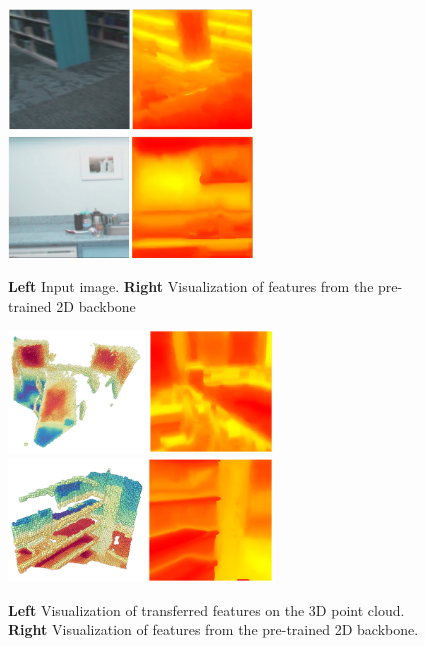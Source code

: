 \documentclass[10pt,twocolumn,letterpaper]{article}
\begin{document}
\begin{figure}
    \centering
    \includegraphics[width=6.5cm]{images/experiments/25.02.2022-image-pretrain-vis2.png}
    \includegraphics[width=6.5cm]{images/experiments/25.02.2022-image-pretrain-vis1.png}
    \caption{\textbf{Left} Input image. \textbf{Right} Visualization of features from the pre-trained 2D backbone}
    \label{fig:features2dvis}
\end{figure}

\begin{figure}
    \centering
    \includegraphics[width=7cm]{images/experiments/image-to-point-vis1.png}
    \includegraphics[width=7cm]{images/experiments/image-to-point-vis2.png}
    \caption{\textbf{Left} Visualization of transferred features on the 3D point cloud. \textbf{Right}  Visualization of features from the pre-trained 2D backbone.}
    \label{fig:features2d-3dvis}
\end{figure}
\end{document}
